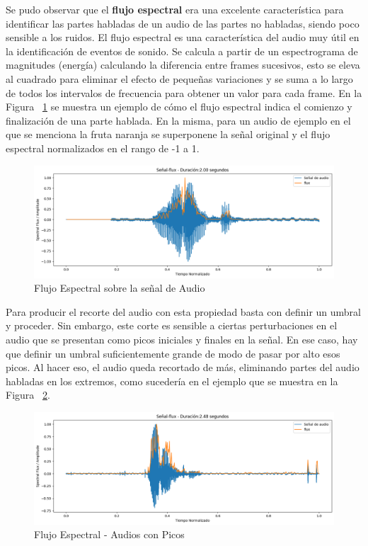 \documentclass[a4paper, 12pt]{article}
\begin{document}
Se pudo observar que el \textbf{flujo espectral} era una excelente característica para identificar las partes habladas de un audio de las partes no habladas, siendo poco sensible a los ruidos. El flujo espectral es una característica del audio muy útil en la identificación de eventos de sonido. Se calcula a partir de un espectrograma de magnitudes (energía) calculando la diferencia entre frames sucesivos, esto se eleva al cuadrado para eliminar el efecto de pequeñas variaciones y se suma a lo largo de todos los intervalos de frecuencia para obtener un valor para cada frame.
En la Figura ~\ref{trimming 1} se muestra un ejemplo de cómo el flujo espectral indica el comienzo y finalización de una parte hablada. En la misma, para un audio de ejemplo en el que se menciona la fruta naranja se superponene la señal original y el flujo espectral normalizados en el rango de -1 a 1.

\begin{figure}[h]
    \centering
    \includegraphics[width=0.8\linewidth]{trimming1.png}
    \caption{Flujo Espectral sobre la señal de Audio}
    \label{trimming 1}
\end{figure}

Para producir el recorte del audio con esta propiedad basta con definir un umbral y proceder. Sin embargo, este corte es sensible a ciertas perturbaciones en el audio que se presentan como picos iniciales y finales en la señal. En ese caso, hay que definir un umbral suficientemente grande de modo de pasar por alto esos picos. Al hacer eso, el audio queda recortado de más, eliminando partes del audio habladas en los extremos, como sucedería en el ejemplo que se muestra en la Figura ~\ref{trimming 2}.

\begin{figure}[h]
    \centering
    \includegraphics[width=0.8\linewidth]{trimming2.png}
    \caption{Flujo Espectral - Audios con Picos}
    \label{trimming 2}
\end{figure}
\end{document}
